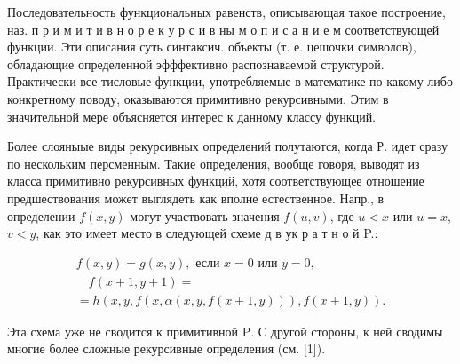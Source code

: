 \documentclass[10pt]{article}
\begin{document}
Последовательность функциональных равенств, описывающая такое построение, наз. п р и м и т и в н о р е к у р с и в ны м о п и с а н и е м соответствующей функции. Эти описания суть синтаксич. объекты (т. е. цешочки символов), обладающие определенной эфффективно распознаваемой структурой. Практически все тисловые функции, употребляемыс в математике по какому-либо конкретному поводу, оказываются примитивно рекурсивными. Этим в значительной мере объясняется интерес к данному классу функций.



Более слояныые виды рекурсивных определений полутаются, когда Р. идет сразу по нескольким персменным. Такие определения, вообще говоря, выводят из класса примитивно рекурсивных функций, хотя соответствующее отношение предшествования может выглядеть как вполне естественное. Напр., в определении $f(x, y)$ могут участвовать значения $f(u, v)$, где $u<x$ или $u=x$, $v<y$, как это имеет место в следующей схеме д в ук р а т н о й P.:



\[

\begin{gathered}

f(x, y)=g(x, y), \text { если } x=0 \text { или } y=0, \\

\quad f(x+1, y+1)= \\

=h(x, y, f(x, \alpha(x, y, f(x+1, y))), f(x+1, y)) .

\end{gathered}

\]



Эта схема уже не сводится к примитивной $\mathrm{P}$. С другой стороны, к ней сводимы многие более сложные рекурсивные определения (см. [1]).
\end{document}
